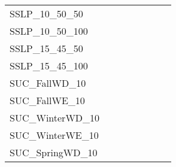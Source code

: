 \begin{table}[H]
{\begin{tabular}{|l|ll|ll|l|l|l|}
			SSLP\_10\_50\_50               &                                 &                                &                                  &                                 &                                    &                            &                            \\
			SSLP\_10\_50\_100              &                                 &                                &                                  &                                 &                                    &                            &                            \\
			SSLP\_15\_45\_50               &                                 &                                &                                  &                                 &                                    &                            &                            \\
			SSLP\_15\_45\_100              &                                 &                                &                                  &                                 &                                    &                            &                            \\ \hline
			SUC\_FallWD\_10                &                                 &                                &                                  &                                 &                                    &                            &                            \\
			SUC\_FallWE\_10                &                                 &                                &                                  &                                 &                                    &                            &                            \\
			SUC\_WinterWD\_10              &                                 &                                &                                  &                                 &                                    &                            &                            \\
			SUC\_WinterWE\_10              &                                 &                                &                                  &                                 &                                    &                            &                            \\
			SUC\_SpringWD\_10              &                                 &                                &                                  &                                 &                                    &                            &                            \\

\end{tabular}}
\end{table}
